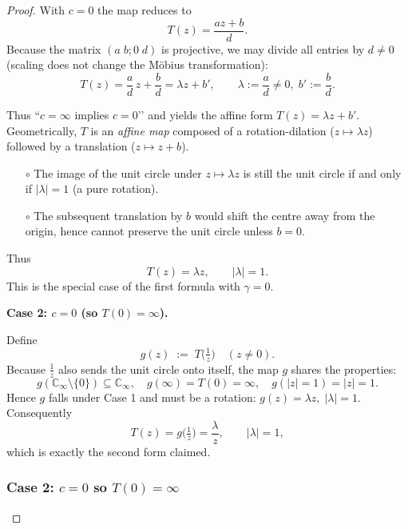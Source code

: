 \documentclass[12pt]{article}
\theoremstyle{definition} %
\theoremstyle{plain} %
\begin{document}
\begin{proof}
With $c=0$ the map reduces to
\[
   T(z)=\frac{az+b}{d}.
\]
Because the matrix $(a\;b;0\;d)$ is projective, we may divide all
entries by $d\neq0$ (scaling does not change the Möbius transformation):
\[
   T(z)=\frac{a}{d}\,z + \frac{b}{d}
       = \lambda z + b',
   \qquad\lambda:=\frac{a}{d}\neq 0,\;
          b':=\frac{b}{d}.
\]

Thus “$c=\infty$ implies $c=0$’’ and yields the affine form
\(T(z)=\lambda z+b'\).
   Geometrically, $T$ is an \emph{affine map} composed of a rotation-dilation
   ($z\mapsto\lambda z$) followed by a translation ($z\mapsto z+b$).
   
   \begin{itemize}
     \item[\(\circ\)]
       The image of the unit circle under $z\mapsto\lambda z$ is still the
       unit circle if and only if $|\lambda|=1$ (a pure rotation).
     \item[\(\circ\)]
       The subsequent translation by $b$ would shift the centre away from
       the origin, hence cannot preserve the unit circle unless $b=0$.
   \end{itemize}
   Thus
   \[
      T(z)=\lambda z,\qquad |\lambda|=1.
   \]
   This is the special case of the first formula with $\gamma=0$.
   
   \bigskip
   \noindent\textbf{Case 2: $c=0$ (so $T(0)=\infty$).}
   
   Define
   \[
      g(z)\;:=\;T\!\bigl(\tfrac1z\bigr)\quad(z\neq0).
   \]
   Because $\tfrac1z$ also sends the unit circle onto itself, the map $g$
   shares the properties:
   \[
      g(\mathbb{{C}}_\infty\setminus\{0\})\subseteq\mathbb{{C}}_\infty,
      \quad g(\infty)=T(0)=\infty,
      \quad g(\lvert z\rvert=1)=\lvert z\rvert=1.
   \]
   Hence $g$ falls under Case 1 and must be a rotation:
   \(
      g(z)=\lambda z,\;|\lambda|=1.
   \)
   Consequently
   \[
      T(z)=g\!\bigl(\tfrac1z\bigr)=\frac{\lambda}{z},\qquad |\lambda|=1,
   \]
   which is exactly the second form claimed.
%
%
\subsubsection*{Case \textup{2}: $c=0$ so $T(0)=\infty$}


\end{proof}
\end{document}
